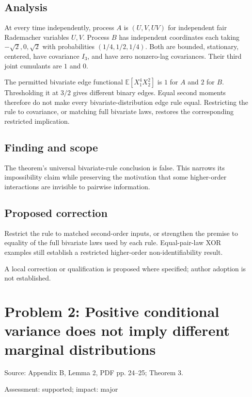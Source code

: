 \documentclass[11pt]{article}
\begin{document}
\subsection*{Analysis}

At every time independently, process \(A\) is \((U,V,UV)\) for independent fair Rademacher variables \(U,V\). Process \(B\) has independent coordinates each taking \(-\sqrt2,0,\sqrt2\) with probabilities \((1/4,1/2,1/4)\). Both are bounded, stationary, centered, have covariance \(I_3\), and have zero nonzero-lag covariances. Their third joint cumulants are \(1\) and \(0\).

The permitted bivariate edge functional \(\mathbb E[X_1^4X_2^2]\) is \(1\) for \(A\) and \(2\) for \(B\). Thresholding it at \(3/2\) gives different binary edges. Equal second moments therefore do not make every bivariate-distribution edge rule equal. Restricting the rule to covariance, or matching full bivariate laws, restores the corresponding restricted implication.

\subsection*{Finding and scope}

The theorem's universal bivariate-rule conclusion is false. This narrows its impossibility claim while preserving the motivation that some higher-order interactions are invisible to pairwise information.

\subsection*{Proposed correction}

Restrict the rule to matched second-order inputs, or strengthen the premise to equality of the full bivariate laws used by each rule. Equal-pair-law XOR examples still establish a restricted higher-order non-identifiability result.

A local correction or qualification is proposed where specified; author adoption is not established.

\section*{Problem 2: Positive conditional variance does not imply different marginal distributions}

Source: Appendix B, Lemma 2, PDF pp. 24–25; Theorem 3.

Assessment: supported; impact: major
\end{document}
